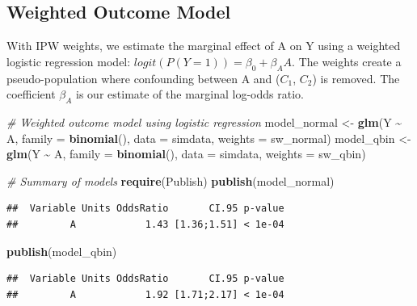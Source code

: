 \documentclass[
]{article}
\newenvironment{Shaded}{\begin{snugshade}}{\end{snugshade}}
\newcommand{\AttributeTok}[1]{\textcolor[rgb]{0.13,0.29,0.53}{#1}}
\newcommand{\CommentTok}[1]{\textcolor[rgb]{0.56,0.35,0.01}{\textit{#1}}}
\newcommand{\FunctionTok}[1]{\textcolor[rgb]{0.13,0.29,0.53}{\textbf{#1}}}
\newcommand{\NormalTok}[1]{#1}
\newcommand{\OtherTok}[1]{\textcolor[rgb]{0.56,0.35,0.01}{#1}}
\newcommand{\SpecialCharTok}[1]{\textcolor[rgb]{0.81,0.36,0.00}{\textbf{#1}}}
\begin{document}
\subsection{Weighted Outcome Model}\label{weighted-outcome-model}

With IPW weights, we estimate the marginal effect of A on Y using a
weighted logistic regression model:
\(logit(P(Y=1)) = \beta_0 + \beta_A A\). The weights create a
pseudo-population where confounding between A and (\(C_1\), \(C_2\)) is
removed. The coefficient \(\beta_A\) is our estimate of the marginal
log-odds ratio.

\begin{Shaded}
\begin{Highlighting}[]
\CommentTok{\# Weighted outcome model using logistic regression}
\NormalTok{model\_normal }\OtherTok{\textless{}{-}} \FunctionTok{glm}\NormalTok{(Y }\SpecialCharTok{\textasciitilde{}}\NormalTok{ A, }
                    \AttributeTok{family =} \FunctionTok{binomial}\NormalTok{(), }
                    \AttributeTok{data =}\NormalTok{ simdata, }
                    \AttributeTok{weights =}\NormalTok{ sw\_normal)}
\NormalTok{model\_qbin }\OtherTok{\textless{}{-}} \FunctionTok{glm}\NormalTok{(Y }\SpecialCharTok{\textasciitilde{}}\NormalTok{ A, }
                  \AttributeTok{family =} \FunctionTok{binomial}\NormalTok{(), }
                  \AttributeTok{data =}\NormalTok{ simdata, }
                  \AttributeTok{weights =}\NormalTok{ sw\_qbin)}

\CommentTok{\# Summary of models}
\FunctionTok{require}\NormalTok{(Publish)}
\FunctionTok{publish}\NormalTok{(model\_normal)}
\end{Highlighting}
\end{Shaded}

\begin{verbatim}
##  Variable Units OddsRatio       CI.95 p-value 
##         A            1.43 [1.36;1.51] < 1e-04
\end{verbatim}

\begin{Shaded}
\begin{Highlighting}[]
\FunctionTok{publish}\NormalTok{(model\_qbin)}
\end{Highlighting}
\end{Shaded}

\begin{verbatim}
##  Variable Units OddsRatio       CI.95 p-value 
##         A            1.92 [1.71;2.17] < 1e-04
\end{verbatim}
\end{document}
